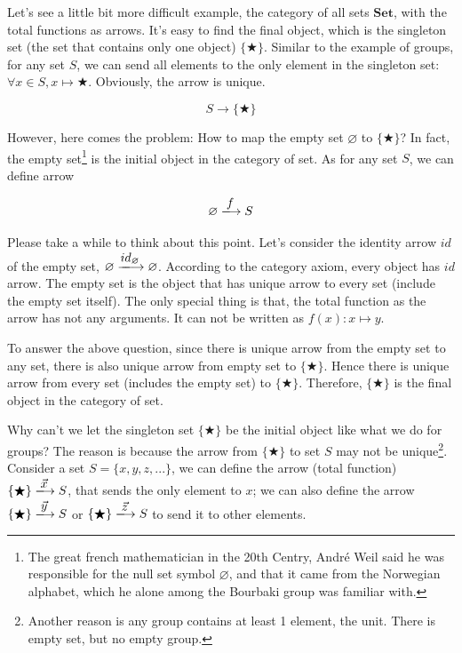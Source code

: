 \documentclass[b5paper]{article}
\begin{document}
\begin{example}
\normalfont
Let's see a little bit more difficult example, the category of all sets $\pmb{Set}$, with the total functions as arrows. It's easy to find the final object, which is the singleton set (the set that contains only one object) $\{ \bigstar \}$. Similar to the example of groups, for any set $S$, we can send all elements to the only element in the singleton set: $\forall x \in S, x \mapsto \bigstar$. Obviously, the arrow is unique.

\[
  S \longrightarrow \{ \bigstar \}
\]

However, here comes the problem: How to map the empty set $\varnothing$ to $\{ \bigstar \}$? In fact, the empty set\footnote{The great french mathematician in the 20th Centry, André Weil said he was responsible for the null set symbol $\varnothing$, and that it came from the Norwegian alphabet, which he alone among the Bourbaki group was familiar with.} is the initial object in the category of set. As for any set $S$, we can define arrow

\[
  \varnothing \arrowto{f} S
\]

Please take a while to think about this point. Let's consider the identity arrow $id$ of the empty set, $\varnothing \arrowto{id_{\varnothing}} \varnothing$. According to the category axiom, every object has $id$ arrow. The empty set is the object that has unique arrow to every set (include the empty set itself). The only special thing is that, the total function as the arrow has not any arguments. It can not be written as $f(x): x \mapsto y$.

To answer the above question, since there is unique arrow from the empty set to any set, there is also unique arrow from empty set to $\{ \bigstar \}$. Hence there is unique arrow from every set (includes the empty set) to $\{ \bigstar \}$. Therefore, $\{ \bigstar \}$ is the final object in the category of set.

Why can't we let the singleton set $\{ \bigstar \}$ be the initial object like what we do for groups? The reason is because the arrow from $\{ \bigstar \}$ to set $S$ may not be unique\footnote{Another reason is any group contains at least 1 element, the unit. There is empty set, but no empty group.}. Consider a set $S = \{x, y, z, ...\}$, we can define the arrow (total function) $\{ \bigstar \} \arrowto{\vec{x}} S$, that sends the only element to $x$; we can also define the arrow $\{ \bigstar \} \arrowto{\vec{y}} S$ or $\{ \bigstar \} \arrowto{\vec{z}} S$ to send it to other elements.


\end{example}
\end{document}
